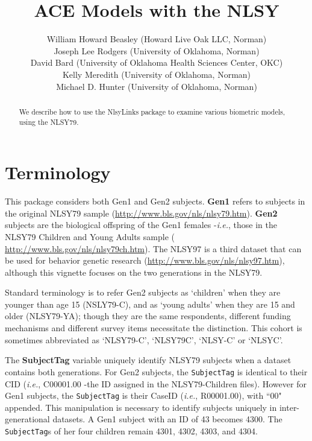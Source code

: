 \documentclass[letterpaper]{article}\usepackage{graphicx, color}
\title{ACE Models with the NLSY}
\author{William Howard Beasley (Howard Live Oak LLC, Norman)\\
Joseph Lee Rodgers (University of Oklahoma, Norman)\\
David Bard (University of Oklahoma Health Sciences Center, OKC)\\
Kelly Meredith (University of Oklahoma, Norman)\\
Michael D. Hunter (University of Oklahoma, Norman)
}
\begin{document}
\newcommand{\code}[1]{\texttt{\small{#1}}}
\newcommand{\pkg}[1]{\textsf{\small{#1}}}
\newcommand{\R}{\textsf{R}} %

\maketitle

\begin{abstract}
   We describe how to use the \pkg{NlsyLinks} package to examine various biometric models, using the NLSY79.
\end{abstract}
\tableofcontents




\section{Terminology} %
This package considers both Gen1 and Gen2 subjects.  \textbf{Gen1} refers to subjects in the original NLSY79 sample (\url{http://www.bls.gov/nls/nlsy79.htm}).  \textbf{Gen2} subjects are the biological offspring of the Gen1 females -\emph{i.e.}, those in the NLSY79 Children and Young Adults sample ( \url{http://www.bls.gov/nls/nlsy79ch.htm}).  The NLSY97 is a third dataset that can be used for behavior genetic research (\url{http://www.bls.gov/nls/nlsy97.htm}), although this vignette focuses on the two generations in the NLSY79.

Standard terminology is to refer Gen2 subjects as `children' when they are younger than age 15 (NSLY79-C), and as `young adults' when they are 15 and older (NLSY79-YA); though they are the same respondents, different funding mechanisms and different survey items necessitate the distinction.  This cohort is sometimes abbreviated as `NLSY79-C', `NLSY79C', `NLSY-C' or `NLSYC'. 

The \textbf{SubjectTag}\label{term:SubjectTag} variable uniquely identify NLSY79 subjects when a dataset contains both generations.  For Gen2 subjects, the \code{SubjectTag} is identical to their CID (\emph{i.e.}, C00001.00 -the ID assigned in the NLSY79-Children files).  However for Gen1 subjects, the \code{SubjectTag} is their CaseID (\emph{i.e.}, R00001.00), with ``00" appended.  This manipulation is necessary to identify subjects uniquely in inter-generational datasets.  A Gen1 subject with an ID of 43 becomes 4300.  The \code{SubjectTag}s of her four children remain 4301, 4302, 4303, and 4304.
\end{document}
